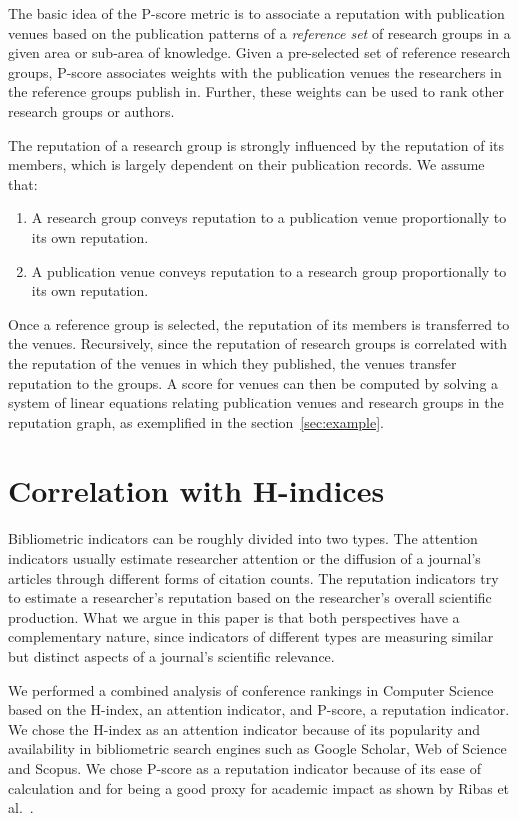 \documentclass[notitlepage]{svjour3}
\begin{document}
The basic idea of the P-score metric is to associate a reputation with publication venues based on the publication patterns of 
a {\em reference set} of research groups in a given area or sub-area of knowledge. Given a pre-selected set of reference research groups, P-score associates weights with the publication venues the researchers in the reference groups publish in. Further, these weights can be used to rank other research groups or authors.

The reputation of a research group is strongly influenced by the reputation of its members, which is largely dependent on their publication records. We assume that:
\begin{enumerate}
\item A research group conveys reputation to a publication venue proportionally to its own reputation.
\item A publication venue conveys reputation to a research group proportionally to its own reputation.
\end{enumerate}

Once a reference group is selected, the reputation of its members is transferred to the venues. Recursively, since the reputation of research groups is correlated with the reputation of the venues in which they published, the venues transfer reputation to the groups. A score for venues can then be computed by solving a system of linear equations relating publication venues and research groups in the reputation graph, as exemplified in the section~\ref{sec:example}.


\section{Correlation with H-indices} 
\label{sec:correlation}

Bibliometric indicators can be roughly divided into two types. The attention indicators usually 
estimate researcher attention or the diffusion of a journal's articles through different 
forms of citation counts. 
The reputation indicators try to estimate a researcher's reputation based on the researcher's 
overall scientific production.
What we argue in this paper is that both perspectives have a complementary nature,
since indicators of different types are measuring similar but distinct aspects of
a journal's scientific relevance. 

We performed a combined analysis of conference rankings in Computer Science based on the H-index, an
attention indicator, and P-score, a reputation indicator. We chose the H-index as an attention 
indicator because of its popularity and availability in bibliometric search engines such as 
Google Scholar, Web of Science and Scopus. We chose P-score as a reputation indicator because 
of its ease of calculation and for being a good proxy for academic impact as shown by Ribas et 
al.~\cite{Ribas2015a}. 
\end{document}
